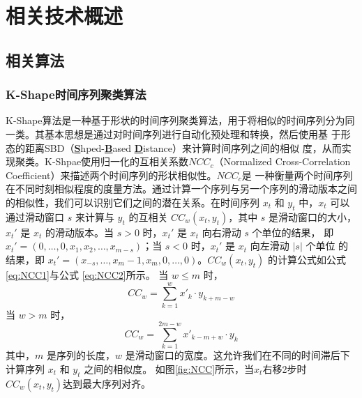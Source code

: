\chapter{相关技术概述}
\section{相关算法}
\subsection{K-Shape时间序列聚类算法}
K-Shape算法\cite{yang2017k}是一种基于形状的时间序列聚类算法，用于将相似的时间序列分为同一类。其基本思想是通过对时间序列进行自动化预处理和转换，然后使用基
于形态的距离SBD（\textbf{\underline{S}}hped-\textbf{\underline{B}}ased \textbf{\underline{D}}istance）来计算时间序列之间的相似
度，从而实现聚类。K-Shpae使用归一化的互相关系数$NCC_{c}$（Normalized Cross-Correlation Coefficient）来描述两个时间序列的形状相似性。$NCC_{c}$是
一种衡量两个时间序列在不同时刻相似程度的度量方法。通过计算一个序列与另一个序列的滑动版本之间的相似性，我们可以识别它们之间的潜在关系。在时间序列 \( x_t \) 
和 \( y_t \) 中，\( x_t \) 可以通过滑动窗口 \( s \) 来计算与 \( y_t \) 的互相关 \( CC_w(x_t, y_t) \)，其中 \( s \) 是滑动窗口的大小，
\( x_t' \) 是 \( x_t \) 的滑动版本。当 \( s > 0 \) 时，\( x_t' \) 是 \( x_t \) 向右滑动 \( s \) 个单位的结果，
即 \( x_t' = (0, \ldots, 0, x_1, x_2, \ldots, x_{m-s}) \)；当 \( s < 0 \) 时，\( x_t' \) 是 \( x_t \) 向左滑动 \( |s| \) 个单位
的结果，即 \( x_t' = (x_{-s}, \ldots, x_m - 1, x_m, 0, \ldots, 0) \)。\( CC_w(x_t, y_t) \) 的计算公式如公式\eqref{eq:NCC1}与公式
\eqref{eq:NCC2}所示。
当 \( w \leq m \) 时，
\begin{equation}
CC_w = \sum_{k=1}^w x'_k \cdot y_{k+m-w}
\label{eq:NCC1}
\end{equation}
当 \( w > m \) 时，
\begin{equation}
CC_w = \sum_{k=1}^{2m-w} x'_{k-m+w} \cdot y_k
\label{eq:NCC2}
\end{equation}
其中，\( m \) 是序列的长度，\( w \) 是滑动窗口的宽度。这允许我们在不同的时间滞后下计算序列 \( x_t \) 和 \( y_t \) 之间的相似度。
如图\ref{fig:NCC}所示，当$x_t$右移2步时\( CC_w(x_t, y_t) \)达到最大序列对齐。
